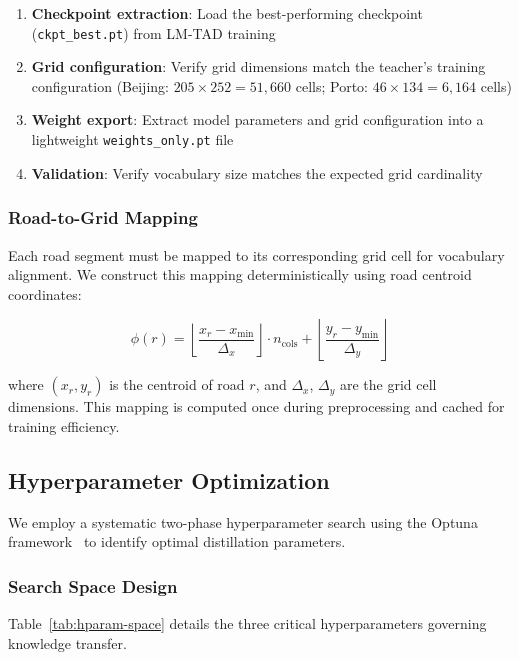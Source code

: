 \begin{enumerate}[noitemsep,topsep=0pt]
\item \textbf{Checkpoint extraction}: Load the best-performing checkpoint (\texttt{ckpt\_best.pt}) from LM-TAD training
\item \textbf{Grid configuration}: Verify grid dimensions match the teacher's training configuration (Beijing: $205 \times 252 = 51{,}660$ cells; Porto: $46 \times 134 = 6{,}164$ cells)
\item \textbf{Weight export}: Extract model parameters and grid configuration into a lightweight \texttt{weights\_only.pt} file
\item \textbf{Validation}: Verify vocabulary size matches the expected grid cardinality
\end{enumerate}

\subsubsection{Road-to-Grid Mapping}

Each road segment must be mapped to its corresponding grid cell for vocabulary alignment. We construct this mapping deterministically using road centroid coordinates:

\begin{equation}
\phi(r) = \left\lfloor \frac{x_r - x_{\min}}{\Delta_x} \right\rfloor \cdot n_{\text{cols}} + \left\lfloor \frac{y_r - y_{\min}}{\Delta_y} \right\rfloor
\end{equation}

where $(x_r, y_r)$ is the centroid of road $r$, and $\Delta_x$, $\Delta_y$ are the grid cell dimensions. This mapping is computed once during preprocessing and cached for training efficiency.

\subsection{Hyperparameter Optimization}
\label{sec:impl-hparam}

We employ a systematic two-phase hyperparameter search using the Optuna framework~\cite{akibaOptunaNextgenerationHyperparameter2019} to identify optimal distillation parameters.

\subsubsection{Search Space Design}

Table~\ref{tab:hparam-space} details the three critical hyperparameters governing knowledge transfer.

